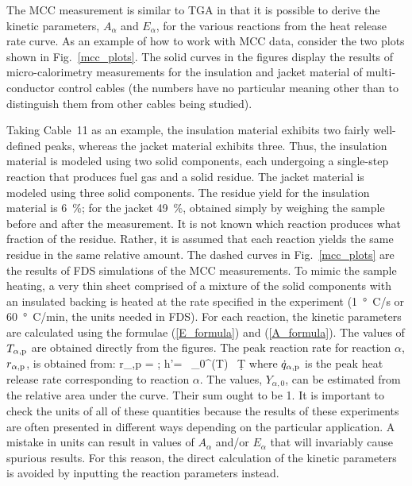\documentclass[11pt]{book}
\begin{document}
The MCC measurement is similar to TGA in that it is possible to derive the kinetic parameters, $A_\alpha$ and $E_\alpha$, for the various reactions from the heat release rate curve. As an example of how to work with MCC data, consider the two plots shown in Fig.~\ref{mcc_plots}. The solid curves in the figures display the results of micro-calorimetry measurements for the insulation and jacket material of multi-conductor control cables (the numbers have no particular meaning other than to distinguish them from other cables being studied).

Taking Cable~11 as an example, the insulation material exhibits two fairly well-defined peaks, whereas the jacket material exhibits three. Thus, the insulation material is modeled using two solid components, each undergoing a single-step reaction that produces fuel gas and a solid residue. The jacket material is modeled using three solid components. The residue yield for the insulation material is 6~\%; for the jacket 49~\%, obtained simply by weighing the sample before and after the measurement. It is not known which reaction produces what fraction of the residue. Rather, it is assumed that each reaction yields the same residue in the same relative amount. The dashed curves in Fig.~\ref{mcc_plots} are the results of FDS simulations of the MCC measurements. To mimic the sample heating, a very thin sheet comprised of a mixture of the solid components with an insulated backing is heated at the rate specified in the experiment (1~\si{\degree C}/s or 60~\si{\degree C}/min, the units needed in FDS). For each reaction, the kinetic parameters are calculated using the formulae (\ref{E_formula}) and (\ref{A_formula}). The values of $T_{\alpha,{\rm p}}$ are obtained directly from the figures. The peak reaction rate for reaction $\alpha$, $r_{\alpha,{\rm p}}$, is obtained from:
\be
   r_{\alpha,{\rm p}} =    \quad ; \quad
   \Delta h'=  \, \int_0^\infty {}(T) \, \d T   \label{r_formula}
\ee
where $\dot{q}_{\alpha,{\rm p}}$ is the peak heat release rate corresponding to reaction $\alpha$. The values, $Y_{\alpha,0}$, can be estimated from the relative area under the curve. Their sum ought to be 1. It is important to check the units of all of these quantities because the results of these experiments are often presented in different ways depending on the particular application. A mistake in units can result in values of $A_\alpha$ and/or $E_\alpha$ that will invariably cause spurious results. For this reason, the direct calculation of the kinetic parameters is avoided by inputting the reaction parameters instead.
\end{document}
